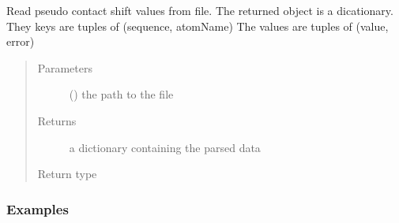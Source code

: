 \documentclass[a4paper,10pt,english,openany,oneside]{sphinxmanual}
\begin{document}
\begin{fulllineitems}
\label{\detokenize{reference/generated/paramagpy.dataparse.read_pcs:paramagpy.dataparse.read_pcs}}
\sphinxAtStartPar
Read pseudo contact shift values from file.
The returned object is a dicationary.
They keys are tuples of (sequence, atomName)
The values are tuples of (value, error)
\begin{quote}\begin{description}
\item[{Parameters}] \leavevmode
\sphinxAtStartPar
{} () \textendash{} the path to the file

\item[{Returns}] \leavevmode
\sphinxAtStartPar
{} \textendash{} a dictionary containing the parsed data

\item[{Return type}] \leavevmode
\sphinxAtStartPar
{\hyperref[\detokenize{reference/generated/paramagpy.dataparse.DataContainer:paramagpy.dataparse.DataContainer}]{}}

\end{description}\end{quote}
\subsubsection*{Examples}

\begin{sphinxVerbatim}[commandchars=\\\{\}]
  
   
    
\end{sphinxVerbatim}

\end{fulllineitems}
\end{document}
